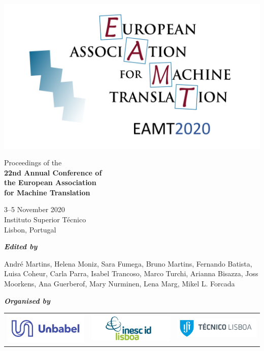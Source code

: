 \documentclass[a4paper,11pt,twoside]{book}
\newcommand{\newoddpage} {\clearpage
  \ifthenelse{\isodd{\value{page}}}{}
  {\thispagestyle{empty}\quad\newpage}}
\begin{document}
\pagestyle{fancy} 
\lhead{}
\rhead{}
\chead{}
\lfoot{} 
\rfoot{} 
\cfoot{\thepage}

\newoddpage
\thispagestyle{empty}
\enlargethispage{1cm}
\begin{center}
\phantom{x}
\vspace{-2cm}

\includegraphics[width=0.8\columnwidth]{logos/eamt2020-lisbon.pdf}

\vspace{1cm}

{\huge Proceedings of the}\\[2ex]
\textbf{\huge 22nd Annual Conference of \\[0.2ex]
  the European Association\\[1.0ex] for Machine Translation} 
  
\vspace{1.5cm}

{\LARGE 3--5 November 2020\\Instituto Superior Técnico\\[0.75ex] Lisbon, Portugal}
\vspace{3cm}

\textbf{\em Edited by}

\vspace{1em}
André Martins, 
Helena Moniz,
Sara Fumega,
Bruno Martins,
Fernando Batista,
Luisa Coheur,
Carla Parra,
Isabel Trancoso,
Marco Turchi,
Arianna Bisazza,
Joss Moorkens,
Ana Guerberof,
Mary Nurminen,
Lena Marg,
Mikel L. Forcada

\vfill

\textbf{\em Organised by}

\vspace{1em}
\begin{tabular}{ccc}
\includegraphics[width=0.30\columnwidth]{logos/unbabel-logo.png} & \includegraphics[width=0.30\columnwidth]{logos/inescid-logo.png} & \includegraphics[width=0.30\columnwidth]{logos/ist-logo.png}\\
\end{tabular}
\end{center}
\end{document}

